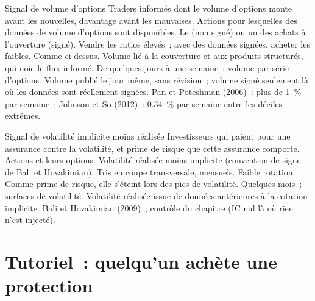 \begin{strategyfile}{Signal de volume d'options}\label{strat:s1:options-implied-signals-for-stocks:volume}
 Traders informés dont le volume d'options monte avant les nouvelles, davantage avant les mauvaises.
 Actions pour lesquelles des données de volume d'options sont disponibles.
 Le  (non signé) ou un  des achats à l'ouverture (signé).
 Vendre les ratios élevés~; avec des données signées, acheter les  faibles.
 Comme ci-dessus.
 Volume lié à la couverture et aux produits structurés, qui noie le flux informé.
 De quelques jours à une semaine~; volume par série d'options.
 Volume publié le jour même, sans révision~; volume signé seulement là où les données sont réellement signées.
 Pan et Poteshman (2006)~: plus de 1~\% par semaine~; Johnson et So (2012)~: 0.34~\% par semaine entre les déciles extrêmes.
\end{strategyfile}

\begin{strategyfile}{Signal de volatilité implicite moins réalisée}\label{strat:s1:options-implied-signals-for-stocks:ivrv}
 Investisseurs qui paient pour une assurance contre la volatilité, et prime de risque que cette assurance comporte.
 Actions et leurs options.
 Volatilité réalisée moins implicite (convention de signe de Bali et Hovakimian).
 Tris en coupe transversale, mensuels.
 Faible rotation.
 Comme prime de risque, elle s'éteint lors des pics de volatilité.
 Quelques mois~; surfaces de volatilité.
 Volatilité réalisée issue de données antérieures à la cotation implicite.
 Bali et Hovakimian (2009)~; contrôle du chapitre (IC nul là où rien n'est injecté).
\end{strategyfile}

\section{Tutoriel~: quelqu'un achète une protection}\label{tut:s1:options-implied-signals-for-stocks:tut}

